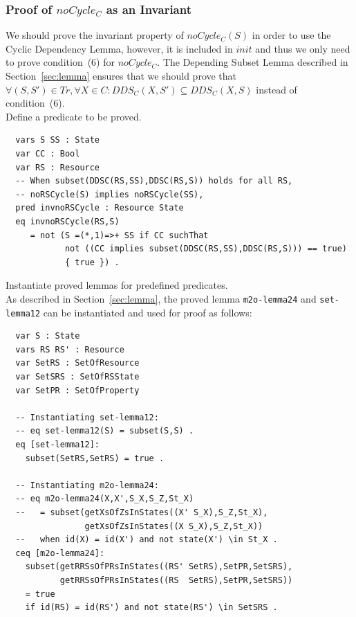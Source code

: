 \documentclass[12pt]{report}
\begin{document}
\subsubsection*{Proof of $noCycle_C$ as an Invariant}
We should prove the invariant property of $noCycle_C(S)$ in order to
use the Cyclic Dependency Lemma, however, it is included in $init$ and
thus we only need to prove condition~(6) for $noCycle_C$.
The Depending Subset Lemma described in Section~\ref{sec:lemma}
ensures that we should prove that $\forall (S,S') \in \mathit{Tr}, \forall X\in
C:\mathit{DDS_C}(X,S')\subseteq \mathit{DDS_C}(X,S)$ instead of
condition~(6).\\

 Define a predicate to be proved. 
\small
\begin{verbatim}
  vars S SS : State
  var CC : Bool
  var RS : Resource
  -- When subset(DDSC(RS,SS),DDSC(RS,S)) holds for all RS,
  -- noRSCycle(S) implies noRSCycle(SS),
  pred invnoRSCycle : Resource State
  eq invnoRSCycle(RS,S) 
     = not (S =(*,1)=>+ SS if CC suchThat
            not ((CC implies subset(DDSC(RS,SS),DDSC(RS,S))) == true)
            { true }) .
\end{verbatim}
\normalsize

 Instantiate proved lemmas for predefined
predicates. \\ As described in Section~\ref{sec:lemma}, the proved
lemma {\tt m2o-lemma24} and {\tt set-lemma12} can be instantiated and
used for proof as follows:
\small
\begin{verbatim}
  var S : State
  vars RS RS' : Resource
  var SetRS : SetOfResource
  var SetSRS : SetOfRSState
  var SetPR : SetOfProperty

  -- Instantiating set-lemma12:
  -- eq set-lemma12(S) = subset(S,S) .
  eq [set-lemma12]:
    subset(SetRS,SetRS) = true .

  -- Instantiating m2o-lemma24:
  -- eq m2o-lemma24(X,X',S_X,S_Z,St_X)
  --   = subset(getXsOfZsInStates((X' S_X),S_Z,St_X),
                getXsOfZsInStates((X S_X),S_Z,St_X))
  --   when id(X) = id(X') and not state(X') \in St_X .
  ceq [m2o-lemma24]:
    subset(getRRSsOfPRsInStates((RS' SetRS),SetPR,SetSRS),
           getRRSsOfPRsInStates((RS  SetRS),SetPR,SetSRS))
    = true
    if id(RS) = id(RS') and not state(RS') \in SetSRS .
\end{verbatim}
\normalsize
\end{document}
